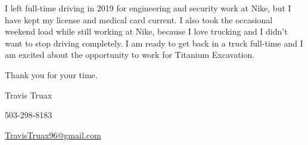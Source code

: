 \documentclass[10pt]{article}
\begin{document}
I left full-time driving in 2019 for engineering and security work at Nike, but I have kept my license and medical card current. I also took the occasional weekend load while still working at Nike, because I love trucking and I didn't want to stop driving completely. I am ready to get back in a truck full-time and I am excited about the opportunity to work for Titanium Excavation.

Thank you for your time.

\vspace{1.25em}
Travis Truax\par
503-298-8183\par
\href{mailto:TravisTruax96@gmail.com}{TravisTruax96@gmail.com}
\end{document}
